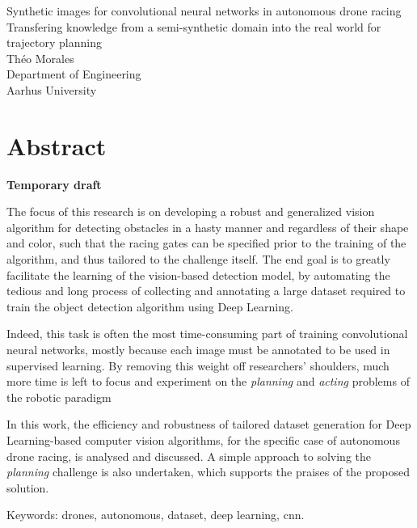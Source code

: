 Synthetic images for convolutional neural networks in autonomous
drone racing \\
Transfering knowledge from a semi-synthetic domain into the real world for
trajectory planning\\
Théo Morales\\
Department of Engineering\\
Aarhus University \setlength{\parskip}{0.5cm}

\thispagestyle{plain}			%
\setlength{\parskip}{0pt plus 1.0pt}
\section*{Abstract}

\textbf{Temporary draft}

The focus of this research is on developing a robust and generalized vision
algorithm for detecting obstacles in a hasty manner and regardless of their
shape and color, such that the racing gates can be specified prior to the
training of the algorithm, and thus tailored to the challenge itself. The end
goal is to greatly facilitate the learning of the vision-based detection model,
by automating the tedious and long process of collecting and annotating a large
dataset required to train the object detection algorithm using Deep Learning.

Indeed, this task is often the most time-consuming part of training
convolutional neural networks, mostly because each image must be annotated to
be used in supervised learning. By removing this weight off researchers'
shoulders, much more time is left to focus and experiment on the
\emph{planning} and \emph{acting} problems of the robotic paradigm

In this work, the efficiency and robustness of tailored dataset generation for
Deep Learning-based computer vision algorithms, for the specific case of
autonomous drone racing, is analysed and discussed.  A simple approach to
solving the \emph{planning} challenge is also undertaken, which supports the
praises of the proposed solution.

\vfill
Keywords: drones, autonomous, dataset, deep learning, cnn.

